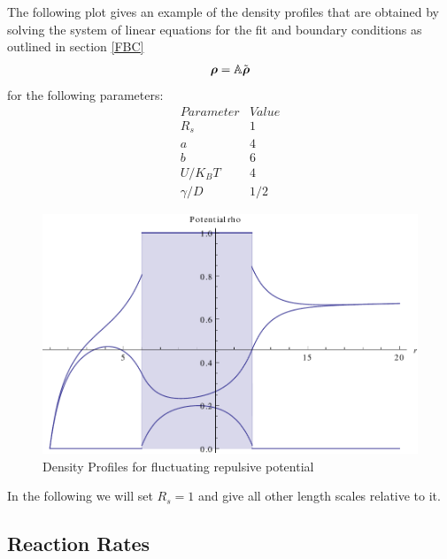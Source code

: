 The following plot gives an example of the density profiles that are obtained by solving the system of linear equations for the fit and boundary conditions as outlined in section \ref{FBC}
\begin{equation}
    \boldsymbol{\mathbf{\rho}} = \mathbb{A} \tilde{\boldsymbol{\mathbf{\rho}}}
\end{equation}
for the following parameters:
\begin{equation}
    \begin{array}{r|l}
        Parameter & Value \\ \hline
        R_s & 1 \\
        a   & 4 \\
        b   & 6 \\
        U/K_B T & 4 \\
        \gamma/D & 1/2
    \end{array} \nonumber
    \label{Parameters}
\end{equation}
\begin{figure}[H]
    \centering
    \includegraphics[width = .9 \textwidth]{plots/rho.pdf}
    \caption{Density Profiles for fluctuating repulsive potential}
    \label{fig:rho}
\end{figure}
In the following we will set $R_s = 1$ and give all other length scales relative to it.
\newpage

\subsection{Reaction Rates}

